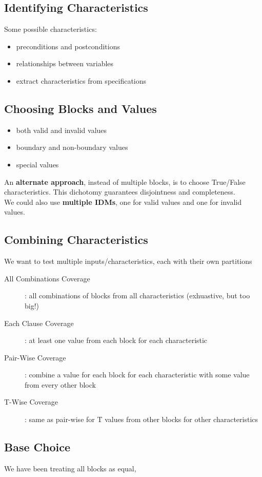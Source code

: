 \documentclass[]{article}
\theoremstyle{definition}
\begin{document}
	\subsection{Identifying Characteristics}
	Some possible characteristics:
	\begin{itemize}
		\item preconditions and postconditions
		\item relationships between variables 
		\item extract characteristics from specifications
	\end{itemize}

	\subsection{Choosing Blocks and Values}
	\begin{itemize}
		\item both valid and invalid values
		\item boundary and non-boundary values
		\item special values
	\end{itemize}
	An \textbf{alternate approach}, instead of multiple blocks, is to choose True/False characteristics.
	This dichotomy guarantees disjointness and completeness. \\
	We could also use \textbf{multiple IDMs}, one for valid values and one for invalid values.

	\subsection{Combining Characteristics}
	We want to test multiple inputs/characteristics, each with their own partitions 
	
	\begin{description}
		\item[All Combinations Coverage]: all combinations of blocks from all characteristics (exhuastive, but too big!)
		\item[Each Clause Coverage]: at least one value from each block for each characteristic
		\item[Pair-Wise Coverage]: combine a value for each block for each characteristic with some value from every other block
		\item[T-Wise Coverage]: same as pair-wise for T values from other blocks for other characteristics
	\end{description}

	\subsection{Base Choice}
	We have been treating all blocks as equal, 



	
\end{document}
